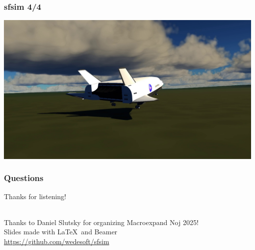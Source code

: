 \documentclass[aspectratio=169,11pt,xcolor=dvipsnames]{beamer}
\begin{document}
\begin{frame}
  \frametitle{sfsim 4/4}
  \begin{center}
    \includegraphics[width=.84\textwidth]{sfsim3}
  \end{center}
\end{frame}

\begin{frame}
  \frametitle{Questions}
  \begin{center}
    \begin{huge}
      Thanks for listening!
    \end{huge}\\
    \vspace{24pt}
    Thanks to Daniel Slutsky for organizing Macroexpand Noj 2025!\\
    \vspace{24pt}
    Slides made with \LaTeX~and Beamer\\
    \vspace{24pt}
    \url{https://github.com/wedesoft/sfsim}
  \end{center}
\end{frame}
\end{document}
